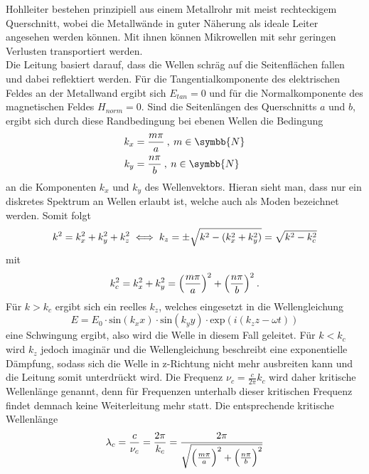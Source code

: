 Hohlleiter bestehen prinzipiell aus einem Metallrohr mit meist rechteckigem Querschnitt, wobei die
Metallwände in guter Näherung als ideale Leiter angesehen werden können. Mit ihnen können
Mikrowellen mit sehr geringen Verlusten transportiert werden. \\
Die Leitung basiert darauf, dass die Wellen schräg auf die Seitenflächen fallen und dabei reflektiert werden.
Für die Tangentialkomponente des elektrischen Feldes an der Metallwand ergibt sich $E_{tan}=0 $ und für die
Normalkomponente des magnetischen Feldes $H_{norm}=0$. Sind die Seitenlängen des Querschnitts $a$ und $b$,
ergibt sich durch diese Randbedingung bei ebenen Wellen die Bedingung
\begin{align}
  k_x &= \frac{m\pi}{a} \:, \: m \in \symbb{N} \\
  k_y &= \frac{n\pi}{b} \:, \: n \in \symbb{N}
  \label{eqn:Bwv}
\end{align}
an die Komponenten $k_x$ und $k_y$ des Wellenvektors.
Hieran sieht man, dass nur ein diskretes Spektrum an Wellen erlaubt ist, welche auch als Moden bezeichnet werden.
Somit folgt
\begin{equation}
  k^2 = k_x^2 + k_y^2 + k_z^2 \\
  \iff k_z = \pm \sqrt{k^2-(k_x^2 + k_y^2)} = \sqrt{k^2-k_c^2}
  \label{eqn:wellenv}
\end{equation}
mit
\begin{equation}
  k_c^2=k_x^2 + k_y^2= \Bigl(\frac{m\pi}{a}\Bigr)^2 + \Bigl(\frac{n\pi}{b}\Bigr)^2 \: .
  \label{eqn:Wellenvektor}
\end{equation}
Für $k>k_c$ ergibt sich ein reelles $k_z$, welches eingesetzt in die Wellengleichung
\begin{equation}
  E=E_0 \cdot \text{sin}(k_xx)\cdot \text{sin}(k_yy) \cdot \text{exp}(i(k_zz-\omega t))
  \label{eqn:Wellengleichung}
\end{equation}
eine Schwingung ergibt, also wird die Welle in diesem Fall geleitet. Für $k<k_c$ wird
$k_z$ jedoch imaginär und die Wellengleichung beschreibt eine exponentielle Dämpfung,
sodass sich die Welle in z-Richtung nicht mehr ausbreiten kann und die Leitung somit unterdrückt wird.
Die Frequenz $\nu_c = \frac{c}{2\pi}k_c$ wird daher kritische Wellenlänge genannt, denn
für Frequenzen unterhalb dieser kritischen Frequenz findet demnach keine
Weiterleitung mehr statt. Die entsprechende kritische Wellenlänge
\begin{equation}
  \lambda_c = \frac{c}{\nu_c}=\frac{2\pi}{k_c} =\frac{2\pi}{\sqrt{\Bigl(\frac{m\pi}{a}\Bigr)^2 + \Bigl(\frac{n\pi}{b}\Bigr)^2}}
  \label{eqn:Lambdac}
\end{equation}
